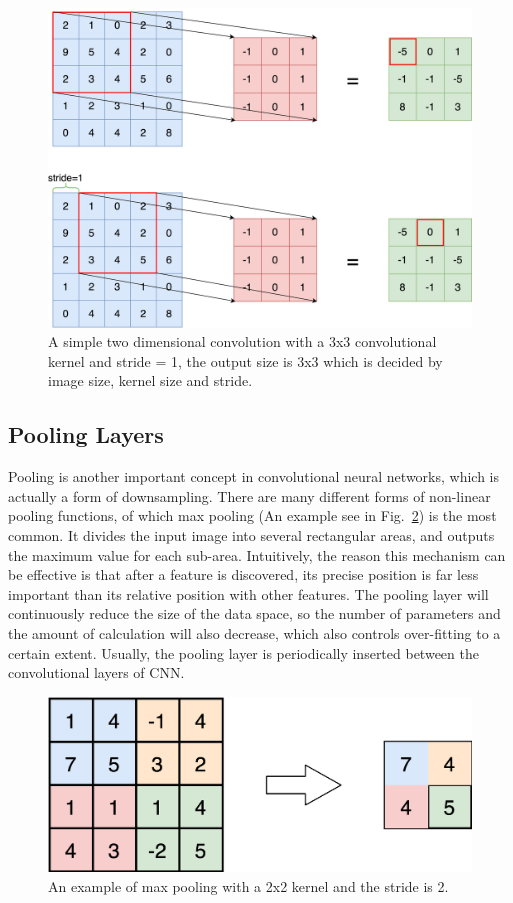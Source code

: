 \begin{figure}[H]
	\centering
	\includegraphics[width=0.6\linewidth]{figures/conv}
	\caption[An example of two-dimensional convolution]{A simple two dimensional convolution with a 3x3 convolutional kernel and stride = 1, the output size is 3x3 which is decided by image size, kernel size and stride.}
	\label{fig:conv}
\end{figure}

\subsection{Pooling Layers}

Pooling is another important concept in convolutional neural networks, which is actually a form of downsampling. There are many different forms of non-linear pooling functions, of which max pooling (An example see in Fig.~\ref{fig:maxpool}) is the most common. It divides the input image into several rectangular areas, and outputs the maximum value for each sub-area. Intuitively, the reason this mechanism can be effective is that after a feature is discovered, its precise position is far less important than its relative position with other features. The pooling layer will continuously reduce the size of the data space, so the number of parameters and the amount of calculation will also decrease, which also controls over-fitting to a certain extent. Usually, the pooling layer is periodically inserted between the convolutional layers of CNN.

\begin{figure}[H]
	\centering
	\includegraphics[width=0.6\linewidth]{figures/maxpool}
	\caption[An example of max pooling]{An example of max pooling with a 2x2 kernel and the stride is 2.}
	\label{fig:maxpool}
\end{figure}

